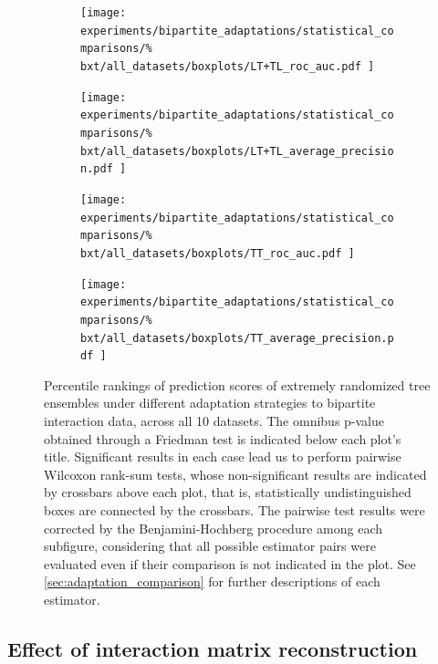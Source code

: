 \begin{figure}[tbh]
    \centering
    \begin{subfigure}{0.49\textwidth}
        \texttt{[image: 
            experiments/bipartite\_adaptations/statistical\_comparisons/\%
            bxt/all\_datasets/boxplots/LT+TL\_roc\_auc.pdf
        ]}
    \end{subfigure}
    \begin{subfigure}{0.49\textwidth}
        \texttt{[image: 
            experiments/bipartite\_adaptations/statistical\_comparisons/\%
            bxt/all\_datasets/boxplots/LT+TL\_average\_precision.pdf
        ]}
    \end{subfigure}

    \begin{subfigure}{0.49\textwidth}
        \texttt{[image: 
            experiments/bipartite\_adaptations/statistical\_comparisons/\%
            bxt/all\_datasets/boxplots/TT\_roc\_auc.pdf
        ]}
    \end{subfigure}
    \begin{subfigure}{0.49\textwidth}
        \texttt{[image: 
            experiments/bipartite\_adaptations/statistical\_comparisons/\%
            bxt/all\_datasets/boxplots/TT\_average\_precision.pdf
        ]}
    \end{subfigure}
    \caption{
        Percentile rankings of prediction scores of extremely randomized tree ensembles under different adaptation strategies to bipartite interaction data, across all 10 datasets.
        The omnibus p-value obtained through a Friedman test is indicated below each plot's title. Significant results in each case lead us to perform pairwise Wilcoxon rank-sum tests, whose non-significant results are indicated by crossbars above each plot, that is, statistically undistinguished boxes are connected by the crossbars. The pairwise test results were corrected by the Benjamini-Hochberg procedure among each subfigure, considering that all possible estimator pairs were evaluated even if their comparison is not indicated in the plot. See \autoref{sec:adaptation_comparison} for further descriptions of each estimator.
    }
    \label{fig:adaptations_bxt}
\end{figure}


\subsection{Effect of interaction matrix reconstruction}
\label{sec:y_reconstruction}

